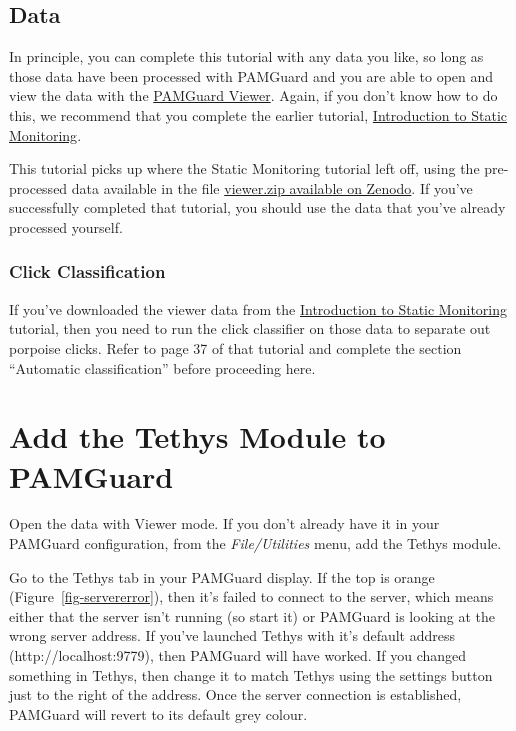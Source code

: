\documentclass[
]{article}
\begin{document}
\subsection{Data}\label{data}

In principle, you can complete this tutorial with any data you like, so
long as those data have been processed with PAMGuard and you are able to
open and view the data with the
\href{https://www.pamguard.org/olhelp/overview/PamMasterHelp/docs/viewerMode.html}{PAMGuard
Viewer}. Again, if you don't know how to do this, we recommend that you
complete the earlier tutorial,
\href{https://www.pamguard.org/tutorials/staticmonitoring.html}{Introduction
to Static Monitoring}.

This tutorial picks up where the Static Monitoring tutorial left off,
using the pre-processed data available in the file
\href{https://zenodo.org/records/13880212}{viewer.zip available on
Zenodo}. If you've successfully completed that tutorial, you should use
the data that you've already processed yourself.

\subsubsection{Click Classification}\label{sec-species}

If you've downloaded the viewer data from the
\href{https://www.pamguard.org/tutorials/staticmonitoring.html}{Introduction
to Static Monitoring} tutorial, then you need to run the click
classifier on those data to separate out porpoise clicks. Refer to page
37 of that tutorial and complete the section ``Automatic
classification'' before proceeding here.

\section{Add the Tethys Module to
PAMGuard}\label{add-the-tethys-module-to-pamguard}

Open the data with Viewer mode. If you don't already have it in your
PAMGuard configuration, from the \emph{File/Utilities} menu, add the
Tethys module.

Go to the Tethys tab in your PAMGuard display. If the top is orange
(Figure~\ref{fig-servererror}), then it's failed to connect to the
server, which means either that the server isn't running (so start it)
or PAMGuard is looking at the wrong server address. If you've launched
Tethys with it's default address (http://localhost:9779), then PAMGuard
will have worked. If you changed something in Tethys, then change it to
match Tethys using the settings button just to the right of the address.
Once the server connection is established, PAMGuard will revert to its
default grey colour.
\end{document}
